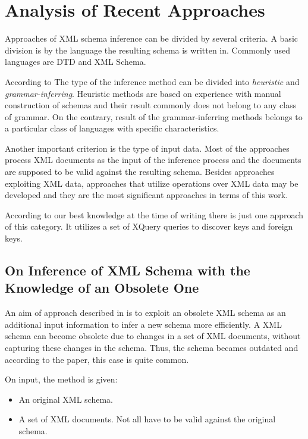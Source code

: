\chapter{Analysis of Recent Approaches}
Approaches of XML schema inference can be divided by several criteria. A basic division is by the language the resulting schema is written in. Commonly used languages are DTD and XML Schema.

According to \cite{Mlynkova:2008:AAX:1494650.1495496} The type of the inference method can be divided into \emph{heuristic} and \emph{grammar-inferring}. Heuristic methods are based on experience with manual construction of schemas and their result commonly does not belong to any class of grammar. On the contrary, result of the grammar-inferring methods belongs to a particular class of languages with specific characteristics.

Another important criterion is the type of input data. Most of the approaches process XML documents as the input of the inference process and the documents are supposed to be valid against the resulting schema. Besides approaches exploiting XML data, approaches that utilize operations over XML data may be developed and they are the most significant approaches in terms of this work.

According to our best knowledge at the time of writing there is just one approach of this category. It utilizes a set of XQuery queries to discover keys and foreign keys.

\section{On Inference of XML Schema with the Knowledge of an Obsolete One}
An aim of approach described in \cite{Mlynkova:2009:IXS:1862681.1862693} is to exploit an obsolete XML schema as an additional input information to infer a new schema more efficiently. A XML schema can become obsolete due to changes in a set of XML documents, without capturing these changes in the schema. Thus, the schema becames outdated and according to the paper, this case is quite common.

On input, the method is given:
\begin{itemize}
\item An original XML schema.
\item A set of XML documents. Not all have to be valid against the original schema.
\end{itemize}

